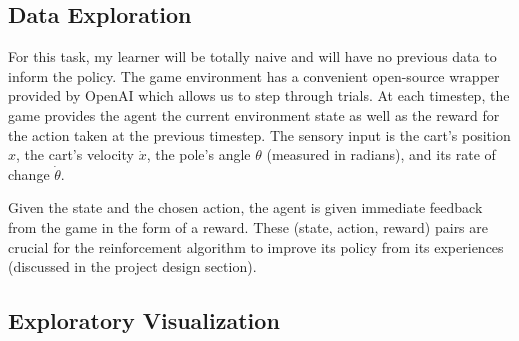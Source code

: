 \documentclass[12pt,a4paper]{article}
\begin{document}
\subsection*{Data Exploration}

For this task, my learner will be totally naive and will have no previous data to inform the policy. The game environment has a convenient open-source wrapper provided by OpenAI which allows us to step through trials.\cite{cartpole} At each timestep, the game provides the agent the current environment state as well as the reward for the action taken at the previous timestep.  The sensory input is the cart's position $x$, the cart's velocity $\dot x$, the pole's angle $\theta$ (measured in radians), and its rate of change $\dot\theta$.\cite{state_def} 

Given the state and the chosen action, the agent is given immediate feedback from the game in the form of a reward. These (state, action, reward) pairs are crucial for the reinforcement algorithm to improve its policy from its experiences (discussed in the project design section).

\subsection*{Exploratory Visualization}
%
\end{document}
